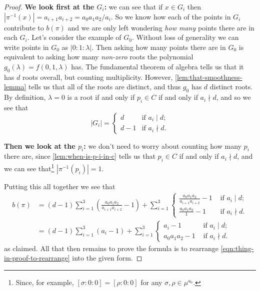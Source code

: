\documentclass[10pt,notitlepage]{article}
\numberwithin{equation}{subsection}
\begin{document}
\begin{proof}
                \textbf{We look first at the $G_i$:}
                we can see that if $x\in G_i$ then $|\pi^{-1}(x)|=a_{i+1}a_{i+2}=a_0a_1a_2/a_i$.
                So we know how each of the points in $G_i$ contribute to $b(\pi)$ and we are only left wondering \emph{how many} points there are in each $G_i$.
                Let's consider the example of $G_0$.
                Without loss of generality we can write points in $G_0$ as $|0:1:\lambda|$.
                Then asking how many points there are in $G_0$ is equivalent to asking how many \emph{non-zero} roots the polynomial $g_0(\lambda)=f(0,1,\lambda)$ has.
                The fundamental theorem of algebra tells us that it has $d$ roots overall, but counting multiplicity.
                However, \cref{lem:that-smoothness-lemma} tells us that all of the roots are distinct, and thus $g_0$ has $d$ distinct roots.
                By definition, $\lambda=0$ is a root if and only if $p_i\in C$ if and only if $a_i\nmid d$, and so we see that
                \[
                    |G_i| =
                    \begin{cases}
                        d &\text{if }a_i\mid d; \\
                        d-1 &\text{if }a_i\nmid d.
                    \end{cases}
                \]

                \textbf{Then we look at the $p_i$:}
                we don't need to worry about counting how many $p_i$ there are, since \cref{lem:when-is-p-i-in-c} tells us that $p_i\in C$ if and only if $a_i\nmid d$, and we can see that\footnote{%
                    Since, for example, $[\sigma:0:0]=[\rho:0:0]$ for any $\sigma,\rho\in\mu^{a_0}$.
                } $|\pi^{-1}(p_i)|=1$.

                Putting this all together we see that
                \begin{align*}
                    b(\pi) &= (d-1)\sum_{i=1}^3\left(\frac{a_0a_1a_2}{a_{i+1}a_{i+2}}-1\right) + \sum_{i=1}^3
                    \begin{cases}
                        \frac{a_0a_1a_2}{a_{i+1}a_{i+2}}-1 &\text{ if }a_i\mid d;\\
                        \frac{a_0a_1a_2}{1}-1&\text{ if }a_i\nmid d.
                    \end{cases} \\
                    &=
                    (d-1)\sum_{i=1}^3(a_i-1) + \sum_{i=1}^3
                    \begin{cases}
                        a_i-1 &\text{ if }a_i\mid d;\\
                        a_0a_1a_2-1&\text{ if }a_i\nmid d.
                    \end{cases}
                \end{align*}
                as claimed.
                All that then remains to prove the formula is to rearrange \cref{eqn:thing-in-proof-to-rearrange} into the given form.
            \end{proof}
\end{document}
